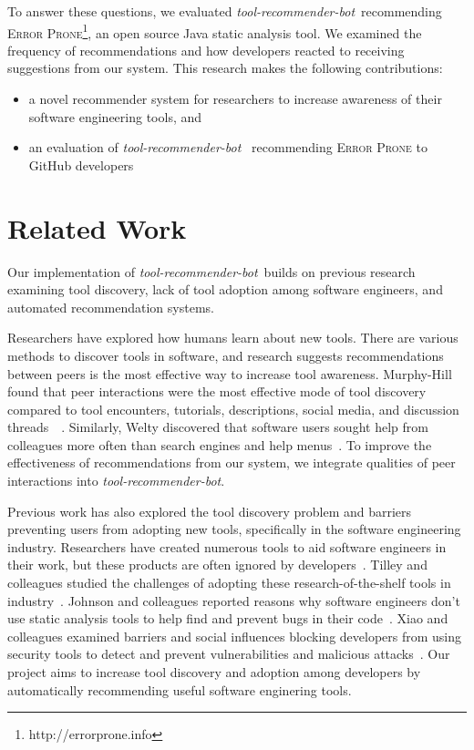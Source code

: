 \documentclass[sigconf,review,anonymous]{acmart}
\newcommand{\tool}{\textsl{tool-recommender-bot}}
\begin{document}
To answer these questions, we evaluated \tool~recommending \textsc{Error Prone}\footnote{http://errorprone.info}, an open source Java static analysis tool. We examined the frequency of recommendations and how developers reacted to receiving suggestions from our system. This research makes the following contributions:

\begin{itemize}
 \item a novel recommender system for researchers to increase awareness of their software engineering tools, and
 \item an evaluation of \tool~ recommending \textsc{Error Prone} to GitHub developers
 \end{itemize}

\section{Related Work}
Our implementation of \tool~builds on previous research examining tool discovery, lack of tool adoption among software engineers, and automated recommendation systems.

Researchers have explored how humans learn about new tools. There are various methods to discover tools in software, and research suggests recommendations between peers is the most effective way to increase tool awareness. Murphy-Hill found that peer interactions were the most effective mode of tool discovery compared to tool encounters, tutorials, descriptions, social media, and discussion threads~\cite{MurphyHill2011PeerInteraction}~\cite{Murphy-Hill2015HowDoUsers}. Similarly, Welty discovered that software users sought help from colleagues more often than search engines and help menus~\cite{Welty2011Help}. To improve the effectiveness of recommendations from our system, we integrate qualities of peer interactions into \tool.

Previous work has also explored the tool discovery problem and barriers preventing users from adopting new tools, specifically in the software engineering industry. Researchers have created numerous tools to aid software engineers in their work, but these products are often ignored by developers~\cite{Ivanov2017Gaps}. Tilley and colleagues studied the challenges of adopting these research-of-the-shelf tools in industry~\cite{Tilley2003ROTS}. Johnson and colleagues reported reasons why software engineers don't use static analysis tools to help find and prevent bugs in their code~\cite{Johnson2013Why}. Xiao and colleagues examined barriers and social influences blocking developers from using security tools to detect and prevent vulnerabilities and malicious attacks~\cite{Xiao2014Security}. Our project aims to increase tool discovery and adoption among developers by automatically recommending useful software enginering tools.
\end{document}
